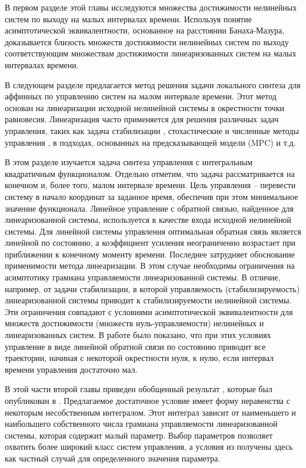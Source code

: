 \documentclass[../main.tex]{subfiles}
\begin{document}
В первом разделе этой главы исследуются множества достижимости нелинейных систем по выходу на малых интервалах времени. Используя понятие асимптотической эквивалентности\cite{Ovs}, основанное на расстоянии Банаха-Мазура, доказывается близость множеств достижимости нелинейных систем по выходу соответствующим множествам достижимости линеаризованных систем на малых интервалах времени. 

В следующем разделе предлагается метод решения задачи локального синтеза для аффинных по управлению систем на малом интервале времени.  
Этот метод основан на линеаризации исходной нелинейной системы в окрестности точки равновесия. 
Линеаризация часто применяется для решения различных задач управления, таких как задача стабилизации \cite{Kras_add,Khalil}, стохастические и численные методы управления \cite{Roxin,EKF,denBerg,Pang}, в подходах, основанных на предсказывающей модели (MPC) \cite{Murillo,LTV_MPC} и т.д.

В этом разделе изучается задача синтеза управления с интегральным квадратичным функционалом. 
Отдельно отметим, что задача рассматривается на конечном и, более того, малом интервале времени. 
Цель управления -- перевести систему в начало координат за заданное время, обеспечив при этом минимальное значение функционала. 
Линейное управление с обратной связью, найденное для линеаризованной системы, используется в качестве входа исходной нелинейной системы. 
Для линейной системы управления оптимальная обратная связь является линейной по состоянию, а коэффициент усиления неограниченно возрастает при приближении к конечному моменту времени. 
Последнее затрудняет обоснование применимости метода линеаризации. 
В этом случае необходимы ограничения на асимптотику грамиана управляемости линеаризованной системы. 
В отличие, например, от задачи стабилизации, в которой управляемость (стабилизируемость) линеаризованной системы приводит к стабилизируемости нелинейной системы. 
Эти ограничения совпадают с условиями асимптотической эквивалентности для множеств достижимости (множеств нуль-управляемости) нелинейных и линеаризованных систем. 
В работе \cite{GusevOsipov} было показано, что при этих условиях управление в виде линейной обратной связи по состоянию приводит все траектории, начиная с некоторой окрестности нуля, к нулю, если интервал времени управления достаточно мал. 

В этой части второй главы приведен обобщенный результат \cite{GusevOsipov}, которые был опубликован в \cite{GusevOsipovMotor}. 
Предлагаемое достаточное условие имеет форму неравенства с некоторым несобственным интегралом. 
Этот интеграл зависит от наименьшего и наибольшего собственного числа грамиана управляемости линеаризованной системы, которая содержит малый параметр. 
Выбор параметров позволяет охватить более широкий класс систем управления, а условия из \cite{GusevOsipov} получены здесь как частный случай для определенного значения параметра.
\end{document}
